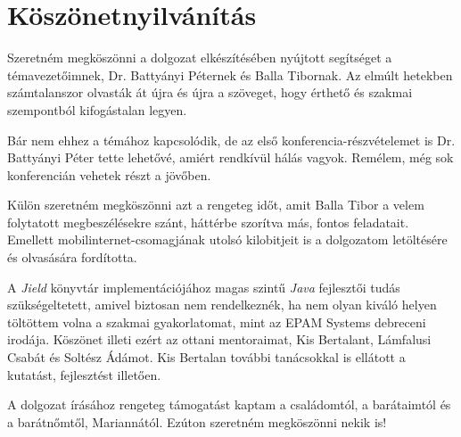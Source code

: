 \chapter*{Köszönetnyilvánítás}

Szeretném megköszönni a dolgozat elkészítésében nyújtott segítséget a témavezetőimnek, Dr. Battyányi Péternek és Balla Tibornak. Az elmúlt hetekben számtalanszor olvasták át újra és újra a szöveget, hogy érthető és szakmai szempontból kifogástalan legyen. 

Bár nem ehhez a témához kapcsolódik, de az első konferencia-részvételemet is Dr. Battyányi Péter tette lehetővé, amiért rendkívül hálás vagyok. Remélem, még sok konferencián vehetek részt a jövőben.

Külön szeretném megköszönni azt a rengeteg időt, amit Balla Tibor a velem folytatott megbeszélésekre szánt, háttérbe szorítva más, fontos feladatait. Emellett mobilinternet-csomagjának utolsó kilobitjeit is a dolgozatom letöltésére és olvasására fordította.

A \textit{Jield} könyvtár implementációjához magas szintű \textit{Java} fejlesztői tudás szükségeltetett, amivel biztosan nem rendelkeznék, ha nem olyan kiváló helyen töltöttem volna a szakmai gyakorlatomat, mint az EPAM Systems debreceni irodája. Köszönet illeti ezért az ottani mentoraimat, Kis Bertalant, Lámfalusi Csabát és Soltész Ádámot. Kis Bertalan további tanácsokkal is ellátott a kutatást, fejlesztést illetően.

A dolgozat írásához rengeteg támogatást kaptam a családomtól, a barátaimtól és a barátnőmtől, Mariannától. Ezúton szeretném megköszönni nekik is!
